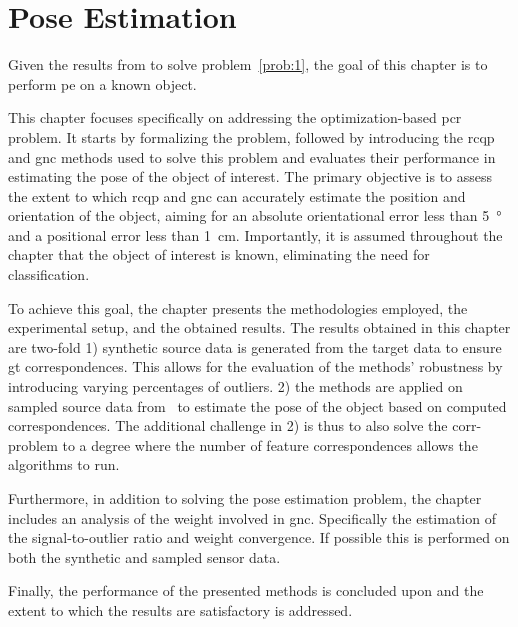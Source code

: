 \chapter{Pose Estimation}\label{ch:2-pose-estimation}

Given the results from  to solve problem~\ref{prob:1}, the goal of this chapter is to perform \gls{pe} on a known object.

This chapter focuses specifically on addressing the optimization-based \gls{pcr} problem. It starts by formalizing the problem, followed by introducing the \gls{rcqp} and \gls{gnc} methods used to solve this problem and evaluates their performance in estimating the pose of the object of interest. The primary objective is to assess the extent to which \gls{rcqp} and \gls{gnc} can accurately estimate the position and orientation of the object, aiming for an absolute orientational error less than \SI{5}{\degree} and a positional error less than \SI{1}{cm}. Importantly, it is assumed throughout the chapter that the object of interest is known, eliminating the need for classification.\medskip

To achieve this goal, the chapter presents the methodologies employed, the experimental setup, and the obtained results. The results obtained in this chapter are two-fold 1) synthetic source data is generated from the target data to ensure \gls{gt} correspondences. This allows for the evaluation of the methods' robustness by introducing varying percentages of outliers. 2) the methods are applied on sampled source data from~ to estimate the pose of the object based on computed correspondences. The additional challenge in 2) is thus to also solve the \gls{corr-problem} to a degree where the number of feature correspondences allows the algorithms to run. \medskip

Furthermore, in addition to solving the pose estimation problem, the chapter includes an analysis of the weight involved in \gls{gnc}. Specifically the estimation of the signal-to-outlier ratio and weight convergence. If possible this is performed on both the synthetic and sampled sensor data. \medskip

Finally, the performance of the presented methods is concluded upon and the extent to which the results are satisfactory is addressed.

